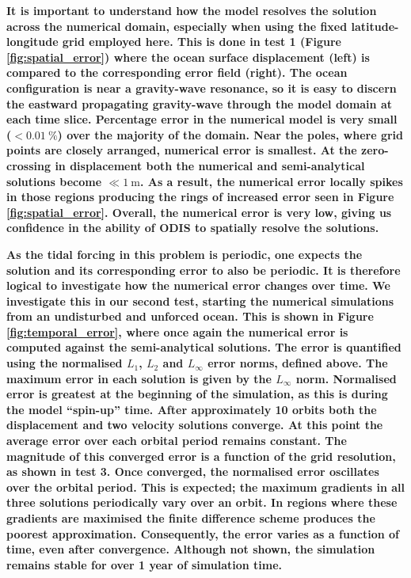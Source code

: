 \textbf{It is important to understand how the model resolves the solution across the numerical domain, especially when using the fixed latitude-longitude grid employed here. This is done in test 1 (Figure \ref{fig:spatial_error}) where the ocean surface displacement (left) is compared to the corresponding error field (right). The ocean configuration is near a gravity-wave resonance, so it is easy to discern the eastward propagating gravity-wave through the model domain at each time slice. Percentage error in the numerical model is very small ($< \SI{0.01}{\percent}$) over the majority of the domain. Near the poles, where grid points are closely arranged, numerical error is smallest. At the zero-crossing in displacement both the numerical and semi-analytical solutions become $\ll \SI{1}{\metre}$. As a result, the numerical error locally spikes in those regions producing the rings of increased error seen in Figure \ref{fig:spatial_error}. Overall, the numerical error is very low, giving us confidence in the ability of ODIS to spatially resolve the solutions.}  

\textbf{As the tidal forcing in this problem is periodic, one expects the solution and its corresponding error to also be periodic. It is therefore logical to investigate how the numerical error changes over time. We investigate this in our second test, starting the numerical simulations from an undisturbed and unforced ocean. This is shown in Figure \ref{fig:temporal_error}, where once again the numerical error is computed against the \citet{matsuyama2014tidal} semi-analytical solutions. The error is quantified using the normalised $L_1$, $L_2$ and $L_{\infty}$ error norms, defined above. The maximum error in each solution is given by the $L_{\infty}$ norm. Normalised error is greatest at the beginning of the simulation, as this is during the model ``spin-up'' time. After approximately \num{10} orbits both the displacement and two velocity solutions converge. At this point the average error over each orbital period remains constant. The magnitude of this converged error is a function of the grid resolution, as shown in test 3. Once converged, the normalised error oscillates over the orbital period. This is expected; the maximum gradients in all three solutions periodically vary over an orbit. In regions where these gradients are maximised the finite difference scheme produces the poorest approximation. Consequently, the error varies as a function of time, even after convergence.  Although not shown, the simulation remains stable for over 1 year of simulation time. }

